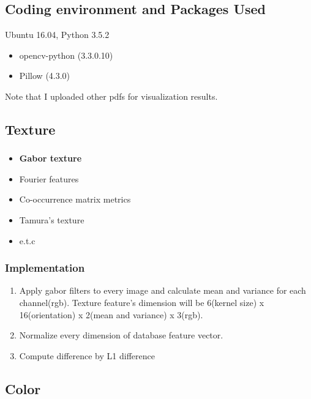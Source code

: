 \documentclass{article}
\begin{document}
\subsection{Coding environment and Packages Used}

Ubuntu 16.04, Python 3.5.2

\begin{itemize}
\item opencv-python (3.3.0.10)
\item Pillow (4.3.0)
\end{itemize}

Note that I uploaded other pdfs for visualization results.



\subsection{Texture}
\subsubsection{}
\begin{itemize}
  \item \textbf{Gabor texture}
  \item Fourier features
  \item Co-occurrence matrix metrics
  \item Tamura's texture
  \item e.t.c
\end{itemize}

\subsubsection{Implementation}
\begin{enumerate}[{Step}~1:]

\item Apply gabor filters to every image and calculate mean and variance for each channel(rgb).
Texture feature's dimension will be 6(kernel size) x 16(orientation) x 2(mean and variance) x 3(rgb).

\item Normalize every dimension of database feature vector.

\item Compute difference by L1 difference
\end{enumerate}

\subsection{Color}
\end{document}
